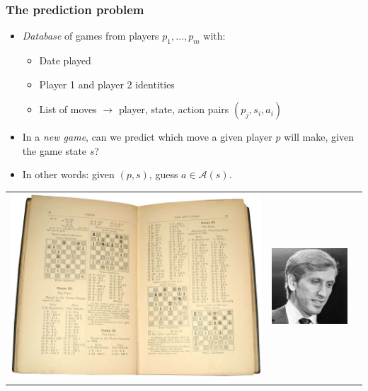 \documentclass{beamer}
\begin{document}
\begin{frame}
\frametitle{The prediction problem}
\begin{itemize}
\item \emph{Database} of games from players $p_1,\hdots, p_m$ with:
\begin{itemize}
\item Date played
\item Player 1 and player 2 identities
\item List of moves $\to$ player, state, action pairs $(p_j, s_i, a_i)$
\end{itemize}
\item In a \emph{new game}, can we predict which move a given player $p$ will make, given the game state $s$?
\item In other words: given $(p, s)$, guess $a \in \mathcal{A}(s)$.
\end{itemize}
\begin{tabular}{ccc}
\includegraphics[scale = 0.1]{chessbook.jpg}&
\includegraphics[scale = 0.25]{fisher.jpeg}&

\end{tabular}
\end{frame}
\end{document}

